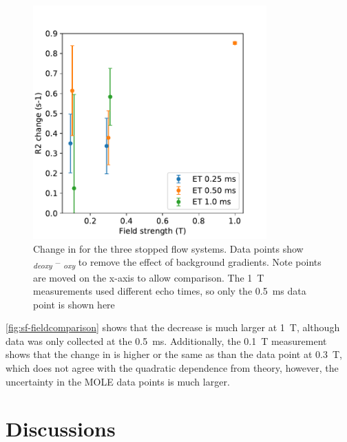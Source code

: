 \begin{figure}[h]
\centering
\includegraphics[width=0.8\textwidth]{figures/stoppedflow/fieldcomparison.pdf}
\caption[Change in \Rtwo for the three stopped flow systems]{Change in \Rtwo for the three stopped flow systems. Data points show \Rtwo\textsubscript{\textit{deoxy}} -- \Rtwo\textsubscript{\textit{oxy}} to remove the effect of background gradients. Note points are moved on the x-axis to allow comparison. The \SI{1}{T} measurements used different echo times, so only the \SI{0.5}{ms} data point is shown here}
\label{fig:sf-fieldcomparison}
\end{figure}

\autoref{fig:sf-fieldcomparison} shows that the \Ttwo decrease is much larger at \SI{1}{T}, although data was only collected at the \SI{0.5}{ms}.
Additionally, the \SI{0.1}{\tesla} measurement shows that the change in \Rtwo is higher or the same as than the data point at \SI{0.3}{T}, which does not agree with the quadratic dependence from theory, however, the uncertainty in the MOLE data points is much larger.


\section{Discussions}

